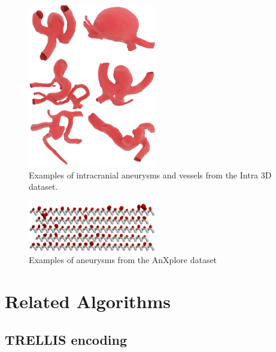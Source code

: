 \documentclass[%
 reprint,
 amsmath,amssymb,
 aps,
 floatfix,
 nofootinbib,
]{revtex4-2}
\begin{document}
\begin{figure}[!h]
  \centering
  \includegraphics[width=0.5\textwidth]{intra.png}
  \caption{Examples of intracranial aneurysms and vessels from the Intra 3D dataset.}
  \label{fig:intra_aneurysms}
\end{figure}

\begin{figure}[!h]
  \centering
  \includegraphics[width=0.5\textwidth]{anxplore.png}
  \caption{Examples of aneurysms from the AnXplore dataset}
  \label{fig:anxplore_aneurysms}
\end{figure}

\section{Related Algorithms} \label{RELATED}

\subsection{TRELLIS encoding}
\end{document}
